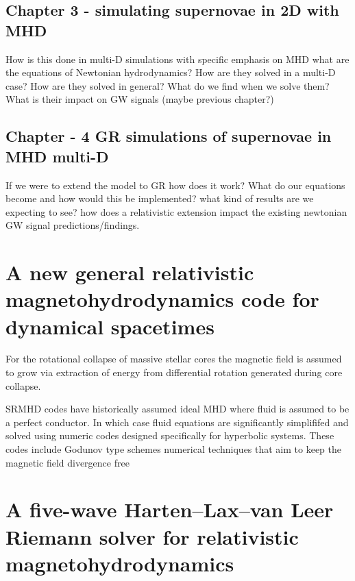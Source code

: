 \documentclass{article}
\begin{document}
\subsection{Chapter 3 - simulating supernovae in 2D with MHD}

How is this done in multi-D simulations with specific emphasis on MHD what are the equations of Newtonian hydrodynamics?  How are they solved in a multi-D case? How are they solved in general? What do we find when we solve them? What is their impact on GW signals (maybe previous chapter?)

\subsection{Chapter - 4 GR simulations of supernovae in MHD multi-D}

If we were to extend the model to GR how does it work? What do our equations become and how would this be implemented? what kind of results are we expecting to see? how does a relativistic extension impact the existing newtonian GW signal predictions/findings. 








\section{A new general relativistic magnetohydrodynamics code for dynamical spacetimes}

\cite{newmhd}

For the rotational collapse of massive stellar cores the magnetic field is assumed to grow via extraction of energy from differential rotation generated during core collapse. 

SRMHD codes have historically assumed ideal MHD where fluid is assumed to be a perfect conductor. In which case fluid equations are significantly simplififed and solved using numeric codes designed specifically for hyperbolic systems. These codes include Godunov type schemes numerical techniques that aim to keep the magnetic field divergence free 

\section{A five-wave Harten--Lax--van Leer Riemann solver for relativistic magnetohydrodynamics}

 \cite{5waverel}
 
\end{document}
